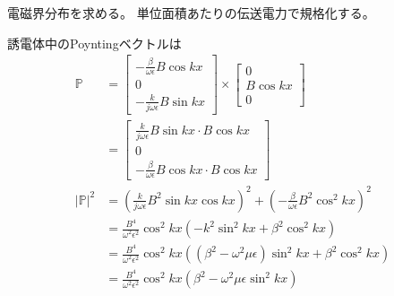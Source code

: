 \documentclass[a4paper,10pt]{bxjsarticle}
\begin{document}
\newpage

電磁界分布を求める。
単位面積あたりの伝送電力で規格化する。

誘電体中のPoyntingベクトルは
\begin{align*}
    \mathbb{P} &= 
    \begin{bmatrix}
        - \frac{\beta}{\omega \epsilon} B \cos kx \\
        0 \\
        -\frac{k}{j\omega \epsilon} B \sin kx
    \end{bmatrix} \times
    \begin{bmatrix}
        0 \\
        B \cos kx \\
        0
    \end{bmatrix} \\
    &= \begin{bmatrix}
        \frac{k}{j\omega \epsilon} B \sin kx \cdot B \cos kx \\
        0 \\
        - \frac{\beta}{\omega \epsilon} B \cos kx \cdot B \cos kx 
    \end{bmatrix} \\
    | \mathbb{P} |^2 &= \left( \frac{k}{j\omega \epsilon} B^2 \sin kx \cos kx \right)^2
                      + \left( - \frac{\beta}{\omega \epsilon} B^2 \cos^2 kx \right)^2 \\
    &= \frac{B^4}{\omega^2 \epsilon^2} \cos^2 kx \left( -k^2 \sin^2 kx + \beta^2 \cos^2 kx \right) \\
    &= \frac{B^4}{\omega^2 \epsilon^2} \cos^2 kx \left( (\beta^2 - \omega^2 \mu \epsilon) \sin^2 kx + \beta^2 \cos^2 kx \right) \\
    &= \frac{B^4}{\omega^2 \epsilon^2} \cos^2 kx \left( \beta^2 - \omega^2 \mu \epsilon \sin^2 kx \right) 
\end{align*}
\end{document}
